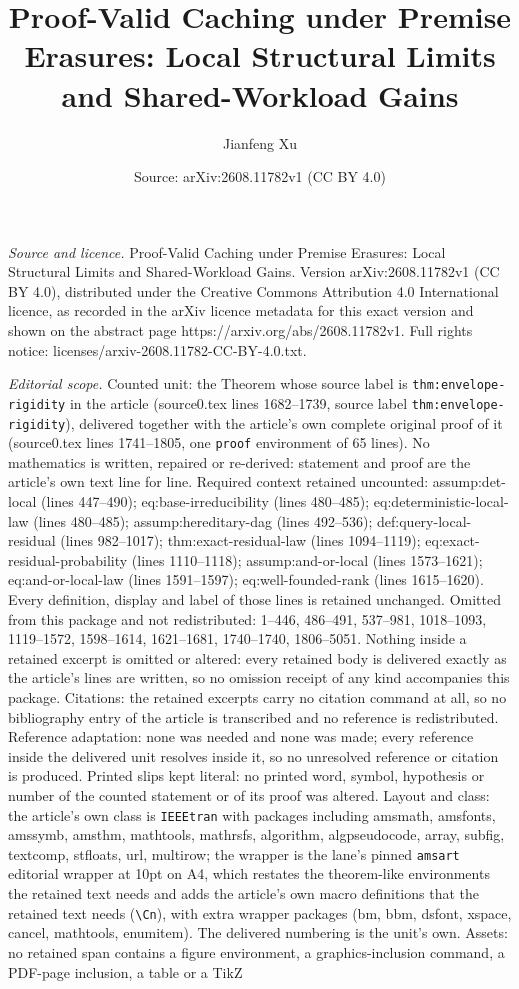 \documentclass[10pt,a4paper]{amsart}
\title[Proof-Valid Caching under Premise Erasures: Local Structural]{Proof-Valid Caching under Premise Erasures: Local Structural Limits and Shared-Workload Gains}
\author{Jianfeng Xu}
\date{Source: arXiv:2608.11782v1 (CC BY 4.0)}
\begin{document}
\maketitle

\noindent\emph{Source and licence.} Proof-Valid Caching under Premise Erasures: Local Structural Limits and Shared-Workload Gains. Version arXiv:2608.11782v1 (CC BY 4.0), distributed under the Creative Commons Attribution 4.0 International licence, as recorded in the arXiv licence metadata for this exact version and shown on the abstract page https://arxiv.org/abs/2608.11782v1. Full rights notice: licenses/arxiv-2608.11782-CC-BY-4.0.txt.\par\smallskip

\noindent\textit{Editorial scope.} Counted unit: the Theorem whose source label is \texttt{thm:envelope-rigidity} in the article (source0.tex lines 1682--1739, source label \texttt{thm:envelope-rigidity}), delivered together with the article's own complete original proof of it (source0.tex lines 1741--1805, one \texttt{proof} environment of 65 lines). No mathematics is written, repaired or re-derived: statement and proof are the article's own text line for line. Required context retained uncounted: assump:det-local (lines 447--490); eq:base-irreducibility (lines 480--485); eq:deterministic-local-law (lines 480--485); assump:hereditary-dag (lines 492--536); def:query-local-residual (lines 982--1017); thm:exact-residual-law (lines 1094--1119); eq:exact-residual-probability (lines 1110--1118); assump:and-or-local (lines 1573--1621); eq:and-or-local-law (lines 1591--1597); eq:well-founded-rank (lines 1615--1620). Every definition, display and label of those lines is retained unchanged. Omitted from this package and not redistributed: 1--446, 486--491, 537--981, 1018--1093, 1119--1572, 1598--1614, 1621--1681, 1740--1740, 1806--5051. Nothing inside a retained excerpt is omitted or altered: every retained body is delivered exactly as the article's lines are written, so no omission receipt of any kind accompanies this package. Citations: the retained excerpts carry no citation command at all, so no bibliography entry of the article is transcribed and no reference is redistributed. Reference adaptation: none was needed and none was made; every reference inside the delivered unit resolves inside it, so no unresolved reference or citation is produced. Printed slips kept literal: no printed word, symbol, hypothesis or number of the counted statement or of its proof was altered. Layout and class: the article's own class is \texttt{IEEEtran} with packages including amsmath, amsfonts, amssymb, amsthm, mathtools, mathrsfs, algorithm, algpseudocode, array, subfig, textcomp, stfloats, url, multirow; the wrapper is the lane's pinned \texttt{amsart} editorial wrapper at 10pt on A4, which restates the theorem-like environments the retained text needs and adds the article's own macro definitions that the retained text needs (\texttt{\textbackslash Cn}), with extra wrapper packages (bm, bbm, dsfont, xspace, cancel, mathtools, enumitem). The delivered numbering is the unit's own. Assets: no retained span contains a figure environment, a graphics-inclusion command, a PDF-page inclusion, a table or a TikZ 
\end{document}
